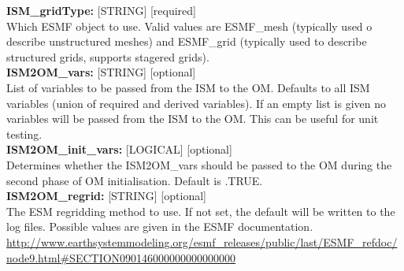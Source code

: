 \documentclass[12pt]{article}
\begin{document}
\begin{flushleft}
\textbf{ISM\_gridType:}        [STRING] [required]                          \\
Which ESMF object to use.  Valid values are ESMF\_mesh (typically used 
o describe unstructured meshes) and ESMF\_grid (typically used to 
describe structured grids, supports stagered grids).                       \\
\vspace{6pt}
\textbf{ISM2OM\_vars:}        [STRING] [optional]                          \\
List of variables to be passed from the ISM to the OM. Defaults to 
all ISM variables (union of required and derived variables). If an empty 
list is given no variables will be passed from the ISM to the OM.  This 
can be useful for unit testing.                                            \\ 
\vspace{6pt}
\textbf{ISM2OM\_init\_vars:}  [LOGICAL] [optional]                         \\
Determines whether the ISM2OM\_vars should be passed to the OM during the 
second phase of OM initialisation.   Default is .TRUE.                     \\ 
\vspace{6pt}
\textbf{ISM2OM\_regrid:}       [STRING] [optional]                         \\
The ESM regridding method to use.  If not set, the default will be 
written to the log files.  Possible values are given in the ESMF 
documentation. 
\url{http://www.earthsystemmodeling.org/esmf_releases/public/last/ESMF_refdoc/node9.html#SECTION090146000000000000000}

\vspace{22pt}


\end{flushleft}
\end{document}
